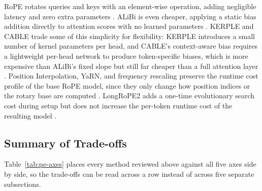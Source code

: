\documentclass[conference]{IEEEtran}
\begin{document}
RoPE rotates queries and keys with an element-wise operation, adding negligible latency and zero extra parameters \cite{su2024roformer}. ALiBi is even cheaper, applying a static bias addition directly to attention scores with no learned parameters \cite{press2022}. KERPLE and CABLE trade some of this simplicity for flexibility: KERPLE introduces a small number of kernel parameters per head, and CABLE's context-aware bias requires a lightweight per-head network to produce token-specific biases, which is more expensive than ALiBi's fixed slope but still far cheaper than a full attention layer \cite{chi2022,veisi2025cable}. Position Interpolation, YaRN, and frequency rescaling preserve the runtime cost profile of the base RoPE model, since they only change how position indices or the rotary base are computed \cite{chen2023,peng2023yarn,liu2024scaling}. LongRoPE2 adds a one-time evolutionary search cost during setup but does not increase the per-token runtime cost of the resulting model \cite{shang2025longrope2}.

\subsection{Summary of Trade-offs}

Table~\ref{tab:pe-axes} places every method reviewed above against all five axes side by side, so the trade-offs can be read across a row instead of across five separate subsections.
\end{document}
